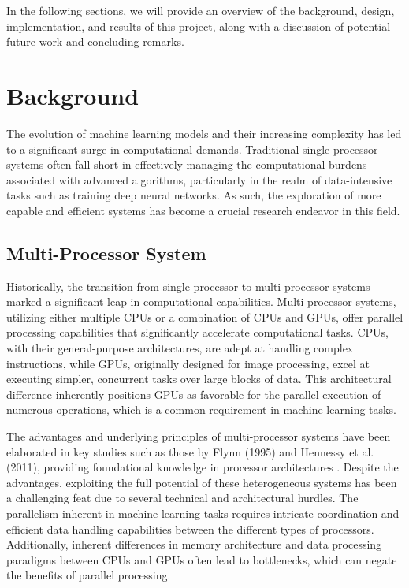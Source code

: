 \documentclass[13pt]{article}
\begin{document}
In the following sections, we will provide an overview of the background, design, implementation, and results of this project, along with a discussion of potential future work and concluding remarks.

\newpage
\section{Background}
The evolution of machine learning models and their increasing complexity has led to a significant surge in computational demands. Traditional single-processor systems often fall short in effectively managing the computational burdens associated with advanced algorithms, particularly in the realm of data-intensive tasks such as training deep neural networks. As such, the exploration of more capable and efficient systems has become a crucial research endeavor in this field.

\subsection{Multi-Processor System}
Historically, the transition from single-processor to multi-processor systems marked a significant leap in computational capabilities. 
Multi-processor systems, utilizing either multiple CPUs or a combination of CPUs and GPUs, offer parallel processing capabilities that significantly accelerate computational tasks. CPUs, with their general-purpose architectures, are adept at handling complex instructions, while GPUs, originally designed for image processing, excel at executing simpler, concurrent tasks over large blocks of data.
This architectural difference inherently positions GPUs as favorable for the parallel execution of numerous operations, which is a common requirement in machine learning tasks. 

The advantages and underlying principles of multi-processor systems have been elaborated in key studies such as those by Flynn (1995) and Hennessy et al. (2011), providing foundational knowledge in processor architectures\cite{paper2} \cite{paper3}. 
Despite the advantages, exploiting the full potential of these heterogeneous systems has been a challenging feat due to several technical and architectural hurdles. The parallelism inherent in machine learning tasks requires intricate coordination and efficient data handling capabilities between the different types of processors. Additionally, inherent differences in memory architecture and data processing paradigms between CPUs and GPUs often lead to bottlenecks, which can negate the benefits of parallel processing.
\end{document}
